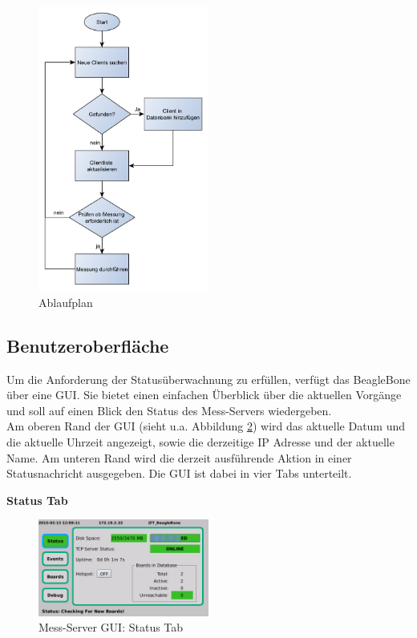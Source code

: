 \begin{figure}[H]
\begin{center}
\includegraphics[width=0.5\textwidth ]{img/general/Ablaufplan_Master.pdf}
\caption{Ablaufplan}
\label{figure_Ablaufplan_Master}
\end{center}
\end{figure}
 
 
\newpage
\subsection{Benutzeroberfläche}
Um die Anforderung der Statusüberwachnung zu erfüllen, verfügt das BeagleBone über eine \ac{GUI}. Sie bietet einen einfachen Überblick über die aktuellen Vorgänge und soll auf einen Blick den Status des Mess-Servers wiedergeben.\\
Am oberen Rand der \ac{GUI} (sieht u.a. Abbildung \ref{figure_MessServerGUIStatus}) wird das aktuelle Datum und die aktuelle Uhrzeit angezeigt, sowie die derzeitige IP Adresse und der aktuelle Name. Am unteren Rand wird die derzeit ausführende Aktion in einer Statusnachricht ausgegeben.
Die \ac{GUI} ist dabei in vier Tabs unterteilt.

\textbf{Status Tab}

\begin{figure}[H]
\begin{center}
\includegraphics[width=0.5\textwidth ]{img/GUI/Server_GUI_Status1.png}
\caption{Mess-Server GUI: Status Tab}
\label{figure_MessServerGUIStatus}
\end{center}
\end{figure}


